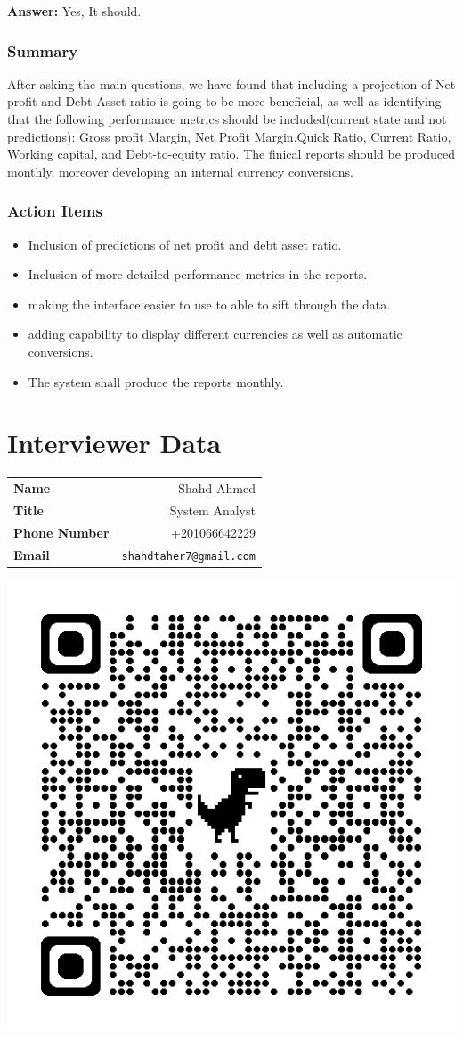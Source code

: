 \documentclass{article}
\begin{document}
\textbf{Answer:} Yes, It should.
\subsubsection{Summary}
After asking the main questions, we have found that including a projection of Net profit and Debt Asset ratio is going to be more beneficial, as well as identifying that the following performance metrics should be included(current state and not predictions): Gross profit Margin, Net Profit Margin,Quick Ratio, Current Ratio, Working capital, and Debt-to-equity ratio. The finical reports should be produced monthly, moreover developing an internal currency conversions.
\subsubsection{Action Items}
\begin{itemize}
    \item Inclusion of predictions of net profit and debt asset ratio.
    \item Inclusion of more detailed performance metrics in the reports.
    \item making the interface easier to use to able to sift through the data.
    \item adding capability to display different currencies as well as automatic conversions.
    \item The system shall produce the reports monthly.
\end{itemize}
\section{Interviewer Data}
\begin{table}[h]
    \centering
    \begin{tabular}{l r}
        \toprule
        \textbf{Name}         & Shahd Ahmed                    \\
        \textbf{Title}        & System Analyst                 \\
        \textbf{Phone Number} & +201066642229                  \\
        \textbf{Email}        & \texttt{shahdtaher7@gmail.com} \\
        \bottomrule
    \end{tabular}
\end{table}
\begin{center}
    \includegraphics[width=0.5\linewidth]{qrcode.png}
\end{center}
\end{document}
